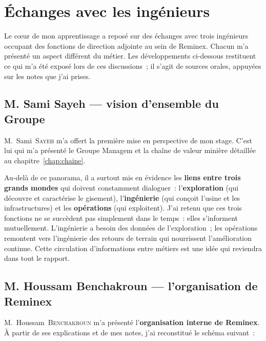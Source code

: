\chapter{Échanges avec les ingénieurs}
\label{chap:ingenieurs}

Le cœur de mon apprentissage a reposé sur des échanges avec trois ingénieurs occupant des fonctions de direction adjointe au sein de Reminex. Chacun m'a présenté un aspect différent du métier. Les développements ci-dessous restituent ce qui m'a été exposé lors de ces discussions~; il s'agit de sources orales, appuyées sur les notes que j'ai prises.

\section{M. Sami Sayeh --- vision d'ensemble du Groupe}

M.~Sami~\textsc{Sayeh} m'a offert la première mise en perspective de mon stage. C'est lui qui m'a présenté le Groupe Managem et la chaîne de valeur minière détaillée au chapitre~\ref{chap:chaine}.

Au-delà de ce panorama, il a surtout mis en évidence les \textbf{liens entre trois grands mondes} qui doivent constamment dialoguer~: l'\textbf{exploration} (qui découvre et caractérise le gisement), l'\textbf{ingénierie} (qui conçoit l'usine et les infrastructures) et les \textbf{opérations} (qui exploitent). J'ai retenu que ces trois fonctions ne se succèdent pas simplement dans le temps~: elles s'informent mutuellement. L'ingénierie a besoin des données de l'exploration~; les opérations remontent vers l'ingénierie des retours de terrain qui nourrissent l'amélioration continue. Cette circulation d'informations entre métiers est une idée qui reviendra dans tout le rapport.

\section{M. Houssam Benchakroun --- l'organisation de Reminex}

M.~Houssam~\textsc{Benchakroun} m'a présenté l'\textbf{organisation interne de Reminex}. À partir de ses explications et de mes notes, j'ai reconstitué le schéma suivant~:

